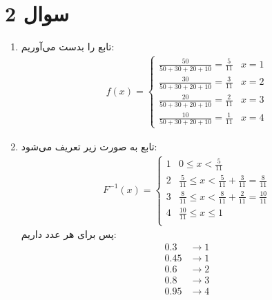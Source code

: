 \section*{سوال 2}
\begin{enumerate}
    \item {} تابع را بدست می‌آوریم:
    \begin{gather*}
        f(x) = \begin{cases}
            \frac{50}{50 + 30 + 20 + 10} = \frac{5}{11} & x = 1\\
            \frac{30}{50 + 30 + 20 + 10} = \frac{3}{11} & x = 2\\
            \frac{20}{50 + 30 + 20 + 10} = \frac{2}{11} & x = 3\\
            \frac{10}{50 + 30 + 20 + 10} = \frac{1}{11} & x = 4
        \end{cases}
    \end{gather*}
    \item تابع به صورت زیر تعریف می‌شود:
    \begin{gather*}
        F^{-1}(x) = \begin{cases}
            1 & 0 \le x < \frac{5}{11}\\
            2 & \frac{5}{11} \le x < \frac{5}{11} + \frac{3}{11} = \frac{8}{11}\\
            3 & \frac{8}{11} \le x < \frac{8}{11} + \frac{2}{11} = \frac{10}{11}\\
            4 & \frac{10}{11} \le x \le 1\\
        \end{cases}
    \end{gather*}
    پس برای هر عدد داریم:
    \begin{align*}
        0.3 &\rightarrow 1\\
        0.45 &\rightarrow 1\\
        0.6 &\rightarrow 2\\
        0.8 &\rightarrow 3\\
        0.95 &\rightarrow 4
    \end{align*}
\end{enumerate}
